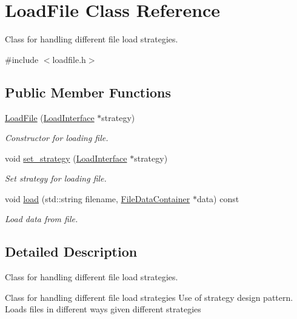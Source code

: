 \hypertarget{classLoadFile}{}\section{Load\+File Class Reference}
\label{classLoadFile}


Class for handling different file load strategies.  




{\ttfamily \#include $<$loadfile.\+h$>$}

\subsection*{Public Member Functions}
\begin{DoxyCompactItemize}
\item 
\mbox{\hyperlink{classLoadFile_a0bab5fb647b94041305923651ac42c28}{Load\+File}} (\mbox{\hyperlink{classLoadInterface}{Load\+Interface}} $\ast$strategy)
\begin{DoxyCompactList}\small\item\em Constructor for loading file. \end{DoxyCompactList}\item 
void \mbox{\hyperlink{classLoadFile_a8cc361d8d1c29766dffeac4ada8d0258}{set\+\_\+strategy}} (\mbox{\hyperlink{classLoadInterface}{Load\+Interface}} $\ast$strategy)
\begin{DoxyCompactList}\small\item\em Set strategy for loading file. \end{DoxyCompactList}\item 
void \mbox{\hyperlink{classLoadFile_a02d94c2968496d097349ebc70f08f0ee}{load}} (std\+::string filename, \mbox{\hyperlink{classFileDataContainer}{File\+Data\+Container}} $\ast$data) const
\begin{DoxyCompactList}\small\item\em Load data from file. \end{DoxyCompactList}\end{DoxyCompactItemize}


\subsection{Detailed Description}
Class for handling different file load strategies. 

Class for handling different file load strategies Use of strategy design pattern. Loads files in different ways given different strategies 

